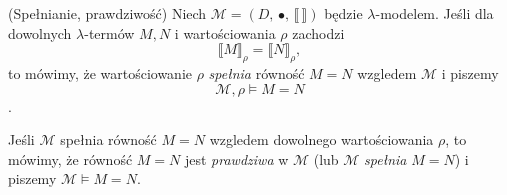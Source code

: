   \begin{definicja}(Spełnianie, prawdziwość)
    Niech \(\mathcal{M}=(D,\,\bullet,\,\llbracket\,\rrbracket)\) będzie \(\lambda\)-modelem.
    Jeśli dla dowolnych \(\lambda\)-termów \(M, N\) i wartościowania \(\rho\) zachodzi
    \[
      \llbracket M \rrbracket_\rho = \llbracket N \rrbracket_\rho,
    \]
    to mówimy, że wartościowanie \(\rho\) \emph{spełnia} równość \(M=N\) wzgledem \(\mathcal{M}\) i piszemy \[\mathcal{M},\rho\models M=N\].

    Jeśli \(\mathcal{M}\) spełnia równość \(M=N\) wzgledem dowolnego wartościowania \(\rho\), to mówimy, że równość \(M=N\) jest \emph{prawdziwa} w \(\mathcal{M}\) (lub \(\mathcal{M}\) \emph{spełnia} \(M=N\)) i piszemy \(\mathcal{M}\models M=N\).
  \end{definicja}



